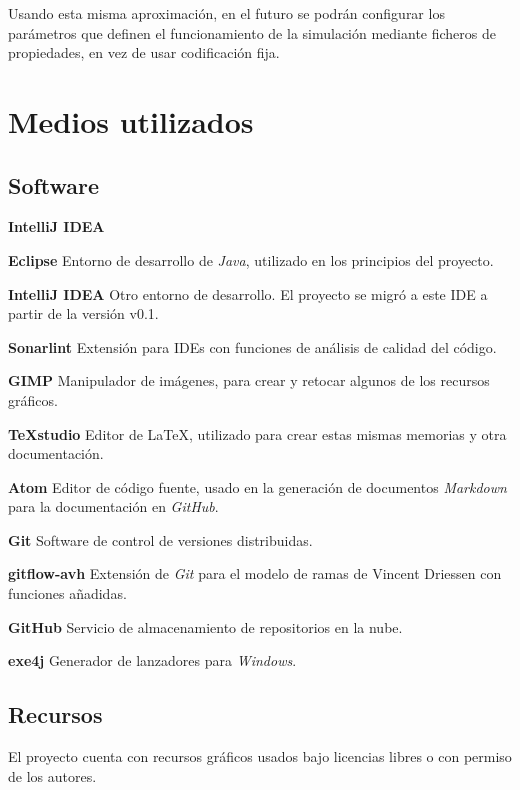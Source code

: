 \documentclass[a4paper,
	11pt,
	parskip=full,
	bibliography=totoc,
	twoside
	]{scrartcl}
\let\oldsection\section
\def\section{\cleardoubleoddpage\oldsection}
\begin{document}
		Usando esta misma aproximación, en el futuro se podrán configurar los parámetros que definen el funcionamiento de la simulación mediante ficheros de propiedades, en vez de usar codificación fija.
	
\section{Medios utilizados}
\label{sec:medios}
	\subsection{Software}
	\begin{labeling}{\textbf{IntelliJ IDEA}}
		\item[\textbf{Eclipse}] Entorno de desarrollo de \textit{Java}, utilizado en los principios del proyecto.
		\item[\textbf{IntelliJ IDEA}] Otro entorno de desarrollo. El proyecto se migró a este IDE a partir de la versión v0.1.
		\item[\textbf{Sonarlint}] Extensión para IDEs con funciones de análisis de calidad del código.
		\item[\textbf{GIMP}] Manipulador de imágenes, para crear y retocar algunos de los recursos gráficos.
		\item[\textbf{TeXstudio}] Editor de \LaTeX, utilizado para crear estas mismas memorias y otra documentación.
		\item[\textbf{Atom}] Editor de código fuente, usado en la generación de documentos \textit{Markdown} para la documentación en \textit{GitHub}.
		\item[\textbf{Git}] Software de control de versiones distribuidas.
		\item[\textbf{gitflow-avh}] Extensión de \textit{Git} para el modelo de ramas de Vincent Driessen con funciones añadidas.
		\item[\textbf{GitHub}] Servicio de almacenamiento de repositorios en la nube.
		\item[\textbf{exe4j}] Generador de lanzadores para \textit{Windows}.
	\end{labeling}
	
	\subsection{Recursos}
	\label{subsec:recursos}
	El proyecto cuenta con recursos gráficos usados bajo licencias libres o con permiso de los autores.
	
\end{document}
